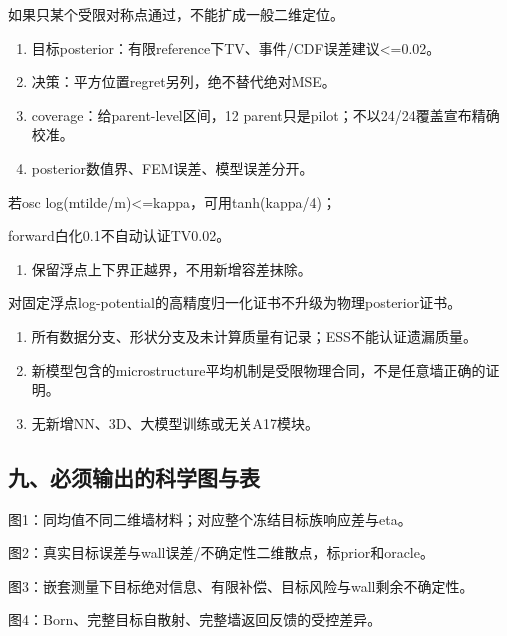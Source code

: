 \documentclass[
  10pt,
  a4paper,
]{article}
\providecommand{\tightlist}{%
  \setlength{\itemsep}{0pt}\setlength{\parskip}{0pt}}
\providecommand{\tightlist}{\setlength{\itemsep}{1pt}\setlength{\parskip}{1pt}}
\begin{document}
如果只某个受限对称点通过，不能扩成一般二维定位。

\begin{enumerate}
\def\labelenumi{\arabic{enumi}.}
\setcounter{enumi}{2}
\item
  目标posterior：有限reference下TV、事件/CDF误差建议\textless=0.02。
\item
  决策：平方位置regret另列，绝不替代绝对MSE。
\item
  coverage：给parent-level区间，12
  parent只是pilot；不以24/24覆盖宣布精确校准。
\item
  posterior数值界、FEM误差、模型误差分开。
\end{enumerate}

若osc log(mtilde/m)\textless=kappa，可用tanh(kappa/4)；

forward白化0.1不自动认证TV0.02。

\begin{enumerate}
\def\labelenumi{\arabic{enumi}.}
\setcounter{enumi}{6}
\tightlist
\item
  保留浮点上下界正越界，不用新增容差抹除。
\end{enumerate}

对固定浮点log-potential的高精度归一化证书不升级为物理posterior证书。

\begin{enumerate}
\def\labelenumi{\arabic{enumi}.}
\setcounter{enumi}{7}
\item
  所有数据分支、形状分支及未计算质量有记录；ESS不能认证遗漏质量。
\item
  新模型包含的microstructure平均机制是受限物理合同，不是任意墙正确的证明。
\item
  无新增NN、3D、大模型训练或无关A17模块。
\end{enumerate}

\hypertarget{ux4e5dux5fc5ux987bux8f93ux51faux7684ux79d1ux5b66ux56feux4e0eux8868}{%
\subsection{九、必须输出的科学图与表}\label{ux4e5dux5fc5ux987bux8f93ux51faux7684ux79d1ux5b66ux56feux4e0eux8868}}

图1：同均值不同二维墙材料；对应整个冻结目标族响应差与eta。

图2：真实目标误差与wall误差/不确定性二维散点，标prior和oracle。

图3：嵌套测量下目标绝对信息、有限补偿、目标风险与wall剩余不确定性。

图4：Born、完整目标自散射、完整墙返回反馈的受控差异。
\end{document}
